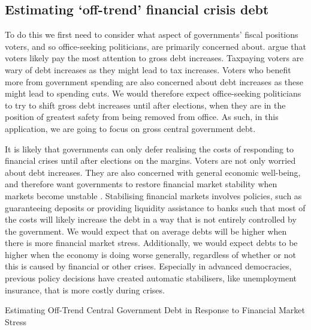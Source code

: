 \documentclass[]{article}
\begin{document}
\subsection{Estimating `off-trend' financial crisis debt}

To do this we first need to consider what aspect of governments' fiscal positions voters, and so office-seeking politicians, are primarily concerned about. \cite{gandrudHallerbergWEP} argue that voters likely pay the most attention to gross debt increases. Taxpaying voters are wary of debt increases as they might lead to tax increases. Voters who benefit more from government spending are also concerned about debt increases as these might lead to spending cuts. We would therefore expect office-seeking politicians to try to shift gross debt increases until after elections, when they are in the position of greatest safety from being removed from office. As such, in this application, we are going to focus on gross central government debt.

It is likely that governments can only defer realising the costs of responding to financial crises until after elections on the margins. Voters are not only worried about debt increases. They are also concerned with general economic well-being, and therefore want governments to restore financial market stability when markets become unstable \citep{Rosas2009}. Stabilising financial markets involves policies, such as guaranteeing deposits or providing liquidity assistance to banks such that most of the costs will likely increase the debt in a way that is not entirely controlled by the government. We would expect that on average debts will be higher when there is more financial market stress. Additionally, we would expect debts to be higher when the economy is doing worse generally, regardless of whether or not this is caused by financial or other crises. Especially in advanced democracies, previous policy decisions have created automatic stabilisers, like unemployment insurance, that is more costly during crises.

\begin{table}
    \caption{Estimating Off-Trend Central Government Debt in Response to Financial Market Stress}
    \label{residuals}
        \begin{center}
            
        \end{center}
\end{table}
\end{document}
